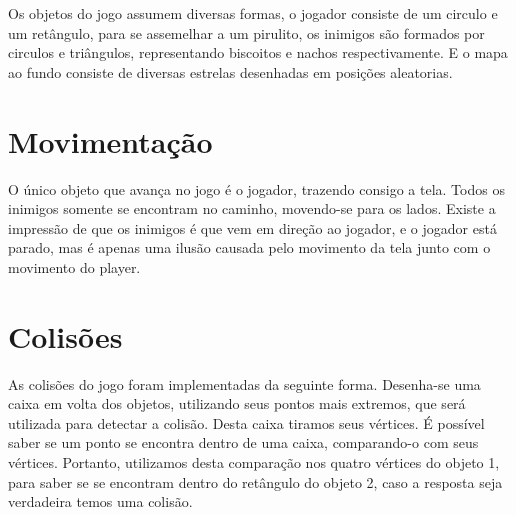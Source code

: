 \documentclass[12pt]{article}
\begin{document}
Os objetos do jogo assumem diversas formas, o jogador consiste de um circulo e um retângulo, para se assemelhar a um
pirulito, os inimigos são formados por circulos e triângulos, representando biscoitos e nachos respectivamente. E o
mapa ao fundo consiste de diversas estrelas desenhadas em posições aleatorias.

\section{Movimentação}

O único objeto que avança no jogo é o jogador, trazendo consigo a tela. Todos os inimigos somente se encontram no
caminho, movendo-se para os lados. Existe a impressão de que os inimigos é que vem em direção ao jogador, e o jogador
está parado, mas é apenas uma ilusão causada pelo movimento da tela junto com o movimento do player.

\section{Colisões}

As colisões do jogo foram implementadas da seguinte forma. Desenha-se uma caixa em volta dos objetos, utilizando
seus pontos mais extremos, que será utilizada para detectar a colisão. Desta caixa tiramos seus vértices. É possível
saber se um ponto se encontra dentro de uma caixa, comparando-o com seus vértices. Portanto, utilizamos desta comparação
nos quatro vértices do objeto 1, para saber se se encontram dentro do retângulo do objeto 2, caso a resposta seja
verdadeira temos uma colisão.



\end{document}
